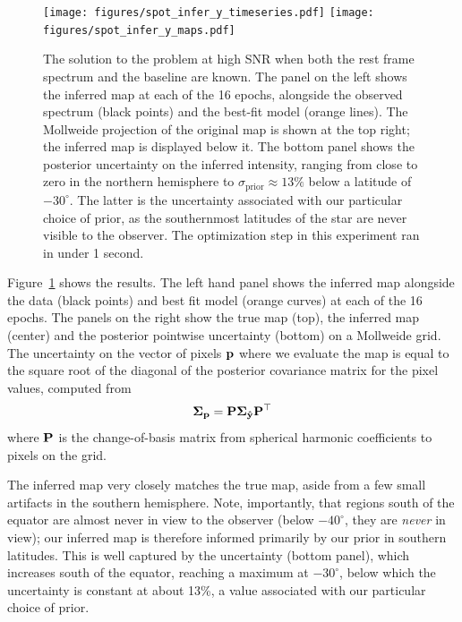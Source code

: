 \documentclass[modern]{aastex631}
\def\timeInferY{under 1 second}
\begin{document}
\begin{figure}[p!]
    \begin{centering}
        \texttt{[image: figures/spot\_infer\_y\_timeseries.pdf]}
        \texttt{[image: figures/spot\_infer\_y\_maps.pdf]}
        \caption{%
            The solution to the \spot problem at high SNR when both the rest frame spectrum and the baseline are known.
            The panel on the left shows the inferred map at each of the 16
            epochs, alongside the observed spectrum (black points) and the best-fit model (orange lines). 
            The Mollweide projection of the original map is shown at the top right; the inferred map is displayed below it. 
            The bottom panel shows the posterior uncertainty on the inferred intensity, ranging from close to zero in the northern hemisphere to $\sigma_\mathrm{prior} \approx 13\%$ below a latitude of $-30^\circ$. 
            The latter is the uncertainty associated with our particular choice of prior, as the southernmost latitudes of the star are never visible to the observer.
            The optimization step in this experiment ran in \timeInferY.
        }
        \label{fig:spot_infer_y}
    \end{centering}
\end{figure}

Figure~\ref{fig:spot_infer_y} shows the results.
The left hand panel shows the inferred map alongside the data (black points) and best fit model (orange curves) at each of the 16 epochs.
The panels on the right show the true map (top), the inferred map (center)
and the posterior pointwise uncertainty (bottom) on a Mollweide grid. 
The uncertainty on the vector of pixels ${\mathbf{p}}$ where we evaluate the map is equal to the square root of the diagonal of the posterior covariance matrix for the pixel values, computed from
%
\begin{align}
    \label{eq:spotstar:uncert}
    \boldsymbol{\Sigma}_{\mathbf{p}} = {\mathbf{P}} \boldsymbol{\Sigma}_{\mathbf{\hat{y}}}{\mathbf{P}}^\top
\end{align}
%
where ${\mathbf{P}}$ is the change-of-basis matrix from spherical harmonic coefficients to pixels on the grid.

The inferred map very closely matches the true map, aside from a few small artifacts in the southern hemisphere. Note, importantly, that regions south of the equator are almost never in view to the observer (below $-40^\circ$, they are \emph{never} in view); our inferred map is therefore informed primarily by our prior in southern latitudes.
This is well captured by the uncertainty (bottom panel), which increases south of the equator, reaching a maximum at $-30^\circ$, below which the uncertainty is constant at about 13\%, a value associated with our particular choice of prior.
\end{document}
